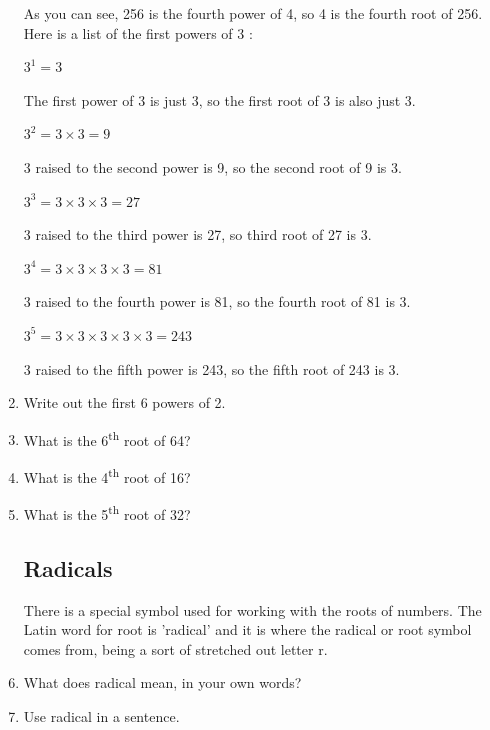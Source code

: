 \documentclass[12pt]{article}
\begin{document}
\begin{enumerate}
As you can see, 256 is the fourth power of 4, so 4 is the fourth root of 256.\\

Here is a list of the first powers of 3 :

\begin{center}
$3^1 = 3$
\end{center}
The first power of 3 is just 3, so the first root of 3 is also just 3.

\begin{center}
$3^2 = 3 \times 3 = 9$
\end{center}
3 raised to the second power is 9, so the second root of 9 is 3.

\begin{center}
$3^3 = 3 \times 3 \times 3 = 27$
\end{center}
3 raised to the third power is 27, so third root of 27 is 3.

\begin{center}
$3^4 = 3 \times 3 \times 3 \times 3 = 81$
\end{center}
3 raised to the fourth power is 81, so the fourth root of 81 is 3.

\begin{center}
$3^5 = 3 \times 3 \times 3 \times 3 \times 3 = 243$
\end{center}
3 raised to the fifth power is 243, so the fifth root of 243 is 3.

\item Write out the first 6 powers of 2.
\item What is the 6\textsuperscript{th} root of 64?
\item What is the 4\textsuperscript{th} root of 16?
\item What is the 5\textsuperscript{th} root of 32?

\subsection*{Radicals}

There is a special symbol \raisebox{.8ex}{$\sqrt{}$} used for working with the roots of numbers. The Latin word for root is 'radical' and it is where the radical or root symbol \raisebox{.8ex}{$\sqrt{}$} comes from, being a sort of stretched out letter r.

\item What does radical mean, in your own words?
\item Use radical in a sentence.


\end{enumerate}
\end{document}

